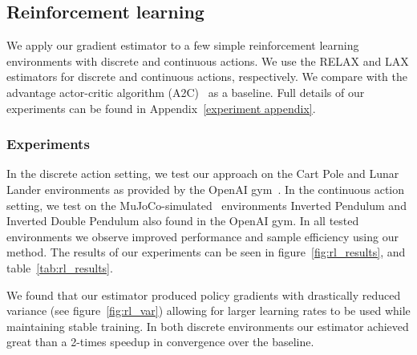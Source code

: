 \documentclass{article}
\newcommand{\LAX}{{\textnormal{LAX}}}
\newcommand{\RELAX}{{\textnormal{RELAX}}}
\begin{document}




\subsection{Reinforcement learning}
We apply our gradient estimator to a few simple reinforcement learning environments with discrete and continuous actions.
We use the \RELAX{} and \LAX{} estimators for discrete and continuous actions, respectively.
We compare with the advantage actor-critic algorithm (A2C)~\citep{sutton2000policy} as a baseline.
Full details of our experiments can be found in Appendix~\ref{experiment appendix}.



\subsubsection{Experiments}
\label{experiments section}
In the discrete action setting, we test our approach on the Cart Pole and Lunar Lander environments as provided by the OpenAI gym~\citep{1606.01540}.
In the continuous action setting, we test on the MuJoCo-simulated~\citep{todorov2012mujoco} environments Inverted Pendulum and Inverted Double Pendulum also found in the OpenAI gym.
In all tested environments we observe improved performance and sample efficiency using our method.
The results of our experiments can be seen in figure~\ref{fig:rl_results}, and table~\ref{tab:rl_results}.

We found that our estimator produced policy gradients with drastically reduced variance (see figure~\ref{fig:rl_var}) allowing for larger learning rates to be used while maintaining stable training.
In both discrete environments our estimator achieved great than a 2-times speedup in convergence over the baseline.
\end{document}
